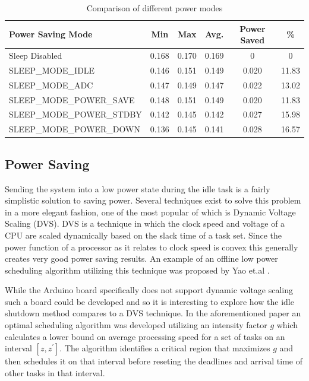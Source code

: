 \documentclass{article}
\begin{document}
\begin{table}[H]
\begin{center}
\begin{tabular}{ |l|c|c|c|c|c| }
\hline
 Power Saving Mode & Min & Max & Avg. & Power Saved & \%\\
\hline
 Sleep Disabled & 0.168 & 0.170 & 0.169 & 0 & 0\\ 
 SLEEP\_MODE\_IDLE & 0.146 & 0.151 & 0.149 & 0.020&11.83 \\
 SLEEP\_MODE\_ADC & 0.147  & 0.149 &  0.147 & 0.022& 13.02\\
 SLEEP\_MODE\_POWER\_SAVE & 0.148 & 0.151 & 0.149 & 0.020&11.83  \\
 SLEEP\_MODE\_POWER\_STDBY & 0.142 & 0.145 & 0.142 & 0.027 & 15.98 \\
 SLEEP\_MODE\_POWER\_DOWN & 0.136 & 0.145 & 0.141 & 0.028 & 16.57 \\
 \hline
\end{tabular}
\end{center}
\caption{Comparison of different power modes}
\label{table:pwr}
\end{table}
\subsection{Power Saving}
 Sending the system into a low power state during the idle task is a fairly simplistic solution to saving power. Several techniques exist to solve this problem in a more elegant fashion, one of the most popular of which is Dynamic Voltage Scaling (DVS). DVS is a technique in which the clock speed and voltage of a CPU are scaled dynamically based on the slack time of a task set. Since the power function of a processor as it relates to clock speed is convex this generally creates very good power saving results. An example of an offline low power scheduling algorithm utilizing this technique was proposed by Yao et.al \cite{yao}.
 
 
While the Arduino board specifically does not support dynamic voltage scaling such a board could be developed and so it is interesting to explore how the idle shutdown method compares to a DVS technique. In the aforementioned paper an optimal scheduling algorithm was developed utilizing an intensity factor $g$ which calculates a lower bound on average processing speed for a set of tasks on an interval $[z, z^{'}]$. The algorithm identifies a critical region that maximizes $g$ and then schedules it on that interval before reseting the deadlines and arrival time of other tasks in that interval.
\end{document}
